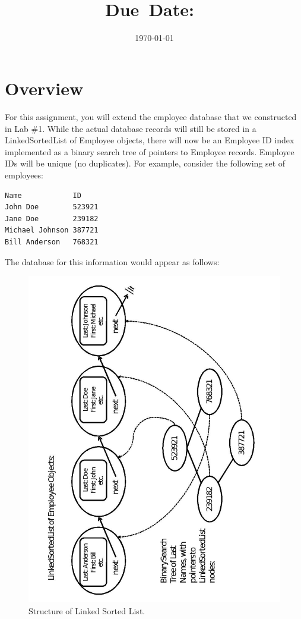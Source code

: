 \documentclass{article}
\title{\textmd{\textbf{\hmwkClass\\\
      \hmwkTitle}}\\\normalsize\small{Due\ Date:\
    \hmwkDueDate}\\}
\date{\today}
\author{\textsc{\hmwkAuthorName}}
\begin{document}
\maketitle

\section{Overview}
For this assignment, you will extend the employee database that we
constructed in Lab \#1.  While the actual database records will still
be stored in a LinkedSortedList of Employee objects, there will now be
an Employee ID index implemented as a binary search tree of pointers
to Employee records.  Employee IDs will be unique (no duplicates).
For example, consider the following set of employees:
\begin{verbatim}
Name            ID
John Doe        523921
Jane Doe        239182
Michael Johnson 387721
Bill Anderson   768321
\end{verbatim}
The database for this information would appear as follows:

\begin{figure}[h!]
  \vspace{-15pt}
  \centering
  \includegraphics[scale=0.5,angle=-90]{structure.pdf}
  \caption{Structure of Linked Sorted List.\label{fig:list}}
  \vspace{-5pt}
\end{figure}
\end{document}
